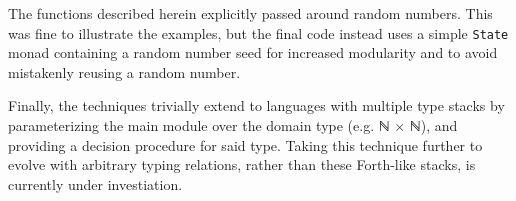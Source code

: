 \documentclass[runningheads,a4paper]{llncs}
\begin{document}
The functions described herein explicitly passed around random
numbers. This was fine to illustrate the examples, but the final code
instead uses a simple \texttt{State} monad containing a random number
seed for increased modularity and to avoid mistakenly reusing a random
number.

Finally, the techniques trivially extend to languages with multiple
type stacks by parameterizing the main module over the domain type
(e.g. ℕ × ℕ), and providing a decision procedure for said type. Taking
this technique further to evolve with arbitrary typing relations,
rather than these Forth-like stacks, is currently under investiation.



\end{document}
